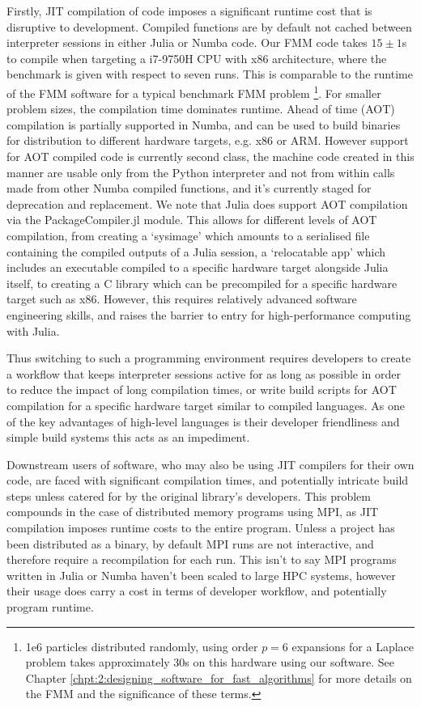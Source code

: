 Firstly, JIT compilation of code imposes a significant runtime cost that is disruptive to development. Compiled functions are by default not cached between interpreter sessions in either Julia or Numba code. Our FMM code takes $15 \pm 1$s to compile when targeting a i7-9750H CPU with x86 architecture, where the benchmark is given with respect to seven runs. This is comparable to the runtime of the FMM software for a typical benchmark FMM problem \footnote{1e6 particles distributed randomly, using order $p=6$ expansions for a Laplace problem takes approximately 30s on this hardware using our software. See Chapter \ref{chpt:2:designing_software_for_fast_algorithms} for more details on the FMM and the significance of these terms.}. For smaller problem sizes, the compilation time dominates runtime. Ahead of time (AOT) compilation is partially supported in Numba, and can be used to build binaries for distribution to different hardware targets, e.g. x86 or ARM. However support for AOT compiled code is currently second class, the machine code created in this manner are usable only from the Python interpreter and not from within calls made from other Numba compiled functions, and it's currently staged for deprecation and replacement. We note that Julia does support AOT compilation via the PackageCompiler.jl module. This allows for different levels of AOT compilation, from creating a `sysimage' which amounts to a serialised file containing the compiled outputs of a Julia session, a `relocatable app' which includes an executable compiled to a specific hardware target alongside Julia itself, to creating a C library which can be precompiled for a specific hardware target such as x86. However, this requires relatively advanced software engineering skills, and raises the barrier to entry for high-performance computing with Julia.

Thus switching to such a programming environment requires developers to create a workflow that keeps interpreter sessions active for as long as possible in order to reduce the impact of long compilation times, or write build scripts for AOT compilation for a specific hardware target similar to compiled languages. As one of the key advantages of high-level languages is their developer friendliness and simple build systems this acts as an impediment.

Downstream users of software, who may also be using JIT compilers for their own code, are faced with significant compilation times, and potentially intricate build steps unless catered for by the original library's developers. This problem compounds in the case of distributed memory programs using MPI, as JIT compilation imposes runtime costs to the entire program. Unless a project has been distributed as a binary, by default MPI runs are not interactive, and therefore require a recompilation for each run. This isn't to say MPI programs written in Julia or Numba haven't been scaled to large HPC systems, however their usage does carry a cost in terms of developer workflow, and potentially program runtime.

